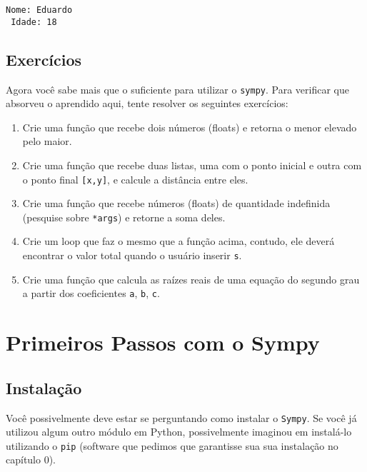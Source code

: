 \documentclass[a4paper, 11pt, brazilian]{article}
\providecommand{\tightlist}{%
      \setlength{\itemsep}{0pt}\setlength{\parskip}{0pt}}
\begin{document}
    \begin{Verbatim}[commandchars=\\\{\}]
 Nome: Eduardo
 Idade: 18
    \end{Verbatim}

    \hypertarget{exercuxedcios}{%
\subsection{Exercícios}\label{exercuxedcios}}

Agora você sabe mais que o suficiente para utilizar o \texttt{sympy}.
Para verificar que absorveu o aprendido aqui, tente resolver os
seguintes exercícios:

\begin{enumerate}
\def\labelenumi{\arabic{enumi}.}
\tightlist
\item
  Crie uma função que recebe dois números (floats) e retorna o menor
  elevado pelo maior.
\item
  Crie uma função que recebe duas listas, uma com o ponto inicial e
  outra com o ponto final \texttt{{[}x,y{]}}, e calcule a distância
  entre eles.
\item
  Crie uma função que recebe números (floats) de quantidade indefinida
  (pesquise sobre \texttt{*args}) e retorne a soma deles.
\item
  Crie um loop que faz o mesmo que a função acima, contudo, ele deverá
  encontrar o valor total quando o usuário inserir
  \texttt{\textquotesingle{}s\textquotesingle{}}.
\item
  Crie uma função que calcula as raízes reais de uma equação do segundo
  grau a partir dos coeficientes \texttt{a}, \texttt{b}, \texttt{c}.
\end{enumerate}

    \hypertarget{primeiros-passos-com-o-sympy}{%
\section{Primeiros Passos com o
Sympy}\label{primeiros-passos-com-o-sympy}}

\hypertarget{instalauxe7uxe3o}{%
\subsection{Instalação}\label{instalauxe7uxe3o}}

Você possivelmente deve estar se perguntando como instalar o
\texttt{Sympy}. Se você já utilizou algum outro módulo em Python,
possivelmente imaginou em instalá-lo utilizando o \texttt{pip} (software
que pedimos que garantisse sua sua instalação no capítulo 0).
\end{document}
